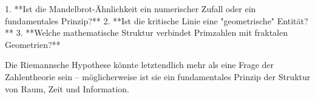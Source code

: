 \documentclass[a4paper,12pt]{article}
\begin{document}
1. **Ist die Mandelbrot-Ähnlichkeit ein numerischer Zufall oder ein fundamentales Prinzip?**
2. **Ist die kritische Linie eine "geometrische" Entität?**
3. **Welche mathematische Struktur verbindet Primzahlen mit fraktalen Geometrien?**

Die Riemannsche Hypothese könnte letztendlich mehr als eine Frage der Zahlentheorie sein – möglicherweise ist sie ein fundamentales Prinzip der Struktur von Raum, Zeit und Information.
\end{document}
